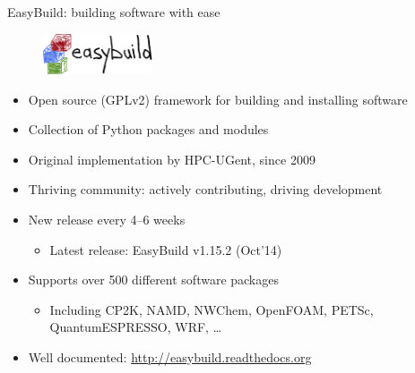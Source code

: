 \documentclass[10pt,xcolor={usenames,dvipsnames}]{beamer}
\begin{document}
\begin{frame}{EasyBuild: building software with ease}
\begin{figure}[centering]\includegraphics[height=1.2cm]{easybuild_logo.jpg}\end{figure}
\begin{itemize}
    \item
        Open source (GPLv2) framework for building and installing software
    \item
        Collection of Python packages and modules
    \item
        Original implementation by HPC-UGent, since 2009
    \item
        Thriving community: actively contributing, driving development
    \item
        New release every 4--6 weeks
        \begin{itemize}
            \item Latest release: EasyBuild v1.15.2 (Oct'14)
        \end{itemize}
    \item
        Supports over 500 different software packages
        \begin{itemize}
            \item
                Including CP2K, NAMD, NWChem, OpenFOAM, PETSc, QuantumESPRESSO,
                WRF, \ldots
        \end{itemize}
    \item
        Well documented: \url{http://easybuild.readthedocs.org}
\end{itemize}
\end{frame}


\end{document}
